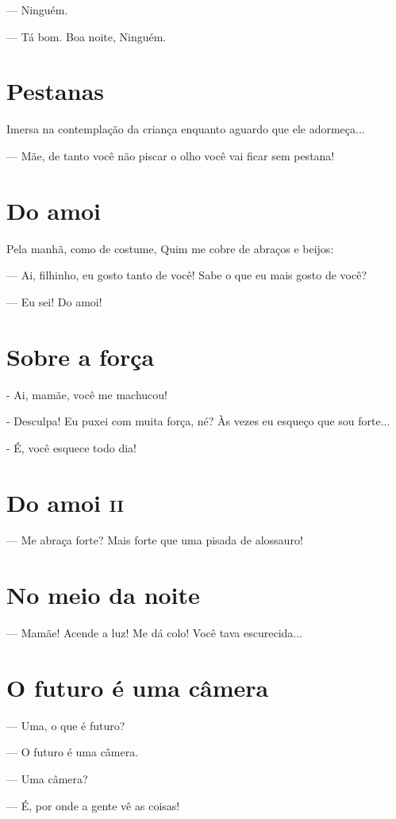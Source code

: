 {--- Ninguém.

--- Tá bom. Boa noite, Ninguém.

\chapter{Pestanas}\label{pestanas}

Imersa na contemplação da criança enquanto aguardo que ele adormeça...

--- Mãe, de tanto você não piscar o olho você vai ficar sem pestana!

\chapter{Do amoi}\label{do-amoi}

Pela manhã, como de costume, Quim me cobre de abraços e beijos:

--- Ai, filhinho, eu gosto tanto de você! Sabe o que eu mais gosto de
você?

--- Eu sei! Do amoi!

\chapter{Sobre a força}

- Ai, mamãe, você me machucou!

- Desculpa! Eu puxei com muita força, né? Às vezes eu esqueço que sou
forte...

- É, você esquece todo dia!

\chapter{Do amoi \textsc{ii}}

--- Me abraça forte? Mais forte que uma pisada de alossauro!

\chapter{No meio da noite}\label{no-meio-da-noite}

--- Mamãe! Acende a luz! Me dá colo! Você tava escurecida...

\chapter{O futuro é uma câmera}\label{o-futuro-uxe9-uma-cuxe2mera}

--- Uma, o que é futuro?

--- O futuro é uma câmera.

--- Uma câmera?

--- É, por onde a gente vê as coisas!
}

